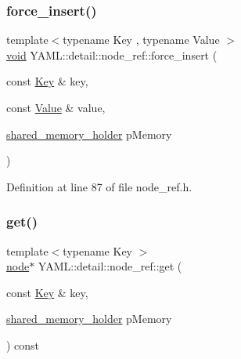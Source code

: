 \subsubsection{\texorpdfstring{force\_insert()}{force\_insert()}}
{\footnotesize\ttfamily template$<$typename Key , typename Value $>$ \\
\mbox{\hyperlink{glad_8h_a950fc91edb4504f62f1c577bf4727c29}{void}} Y\+A\+M\+L\+::detail\+::node\+\_\+ref\+::force\+\_\+insert (\begin{DoxyParamCaption}\item[{const \mbox{\hyperlink{namespace_y_a_m_l_a67c320aa50d3de7ecba1d0b8775dd684a1af533fc24b0311b8c4d5ac2870283aa}{Key}} \&}]{key,  }\item[{const \mbox{\hyperlink{namespace_y_a_m_l_a67c320aa50d3de7ecba1d0b8775dd684a0d29a86853d6a9cfe0241ab7ea8da97c}{Value}} \&}]{value,  }\item[{\mbox{\hyperlink{namespace_y_a_m_l_1_1detail_a228c4b3b6ba1058b474d40afc218e21d}{shared\+\_\+memory\+\_\+holder}}}]{p\+Memory }\end{DoxyParamCaption})\hspace{0.3cm}{\ttfamily [inline]}}



Definition at line 87 of file node\+\_\+ref.\+h.

\mbox{\label{class_y_a_m_l_1_1detail_1_1node__ref_acbb383d775d42821437e0c2e2c68cfec}} 
\subsubsection{\texorpdfstring{get()}{get()}\hspace{0.1cm}{\footnotesize\ttfamily [1/4]}}
{\footnotesize\ttfamily template$<$typename Key $>$ \\
\mbox{\hyperlink{class_y_a_m_l_1_1detail_1_1node}{node}}$\ast$ Y\+A\+M\+L\+::detail\+::node\+\_\+ref\+::get (\begin{DoxyParamCaption}\item[{const \mbox{\hyperlink{namespace_y_a_m_l_a67c320aa50d3de7ecba1d0b8775dd684a1af533fc24b0311b8c4d5ac2870283aa}{Key}} \&}]{key,  }\item[{\mbox{\hyperlink{namespace_y_a_m_l_1_1detail_a228c4b3b6ba1058b474d40afc218e21d}{shared\+\_\+memory\+\_\+holder}}}]{p\+Memory }\end{DoxyParamCaption}) const\hspace{0.3cm}{\ttfamily [inline]}}



